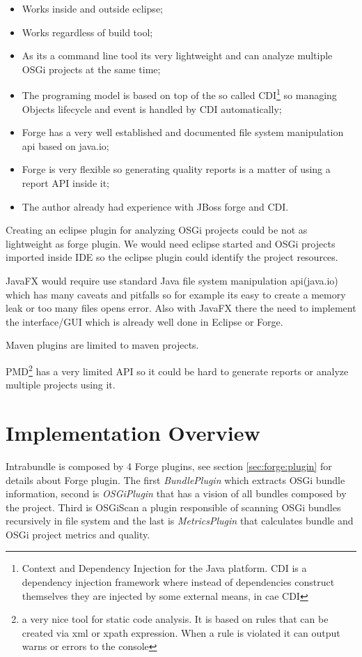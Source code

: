 \begin{itemize}
\item Works inside and outside eclipse;
\item Works regardless of build tool;
\item As its a command line tool its very lightweight and can analyze multiple OSGi projects at the same time;
\item The programing model is based on top of the so called CDI\footnote{Context and Dependency Injection for the Java platform. CDI is a dependency injection framework where instead of dependencies construct themselves they are injected by some external means, in cae CDI} so managing Objects lifecycle and event is handled by CDI automatically;
\item Forge has a very well established and documented file system manipulation api based on java.io;
\item Forge is very flexible so generating quality reports is a matter of using a report API inside it;  
\item The author already had experience with JBoss forge and CDI. 
\end{itemize}

Creating an eclipse plugin for analyzing OSGi projects could be not as lightweight as forge plugin. We would need eclipse started and OSGi projects imported inside IDE so the eclipse plugin could identify the project resources.

JavaFX would require use standard Java file system manipulation api(java.io) which has many caveats and pitfalls so for example its easy to create a memory leak or too many files opens error. Also with JavaFX there the need to implement the interface/GUI which is already well done in Eclipse or Forge.

Maven plugins are limited to maven projects.

PMD\footnote{a very nice tool for static code analysis. It is based on rules that can be created via xml or xpath expression. When a rule is violated it can output warns or errors to the console} has a very limited API so it could be hard to generate reports or analyze multiple projects using it. 


\section{Implementation Overview}

Intrabundle is composed by 4 Forge plugins, see section \ref{sec:forge:plugin} for details about Forge plugin. The first \emph{BundlePlugin} which extracts OSGi bundle information, second is \emph{OSGiPlugin} that has a vision of all bundles composed by the project. Third is OSGiScan a plugin responsible of scanning OSGi bundles recursively in file system and the last is \emph{MetricsPlugin} that calculates bundle and OSGi project metrics and quality.

